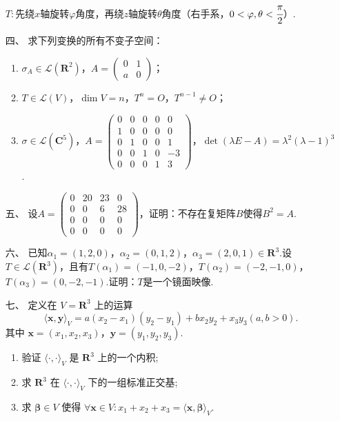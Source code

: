 \begin{enumerate}
    $T:$先绕$x$轴旋转$\varphi$角度，再绕$z$轴旋转$\theta$角度（右手系，$0<\varphi,\theta<\cfrac{\pi}{2}$）.
	\item[四、]求下列变换的所有不变子空间：
	\begin{enumerate}[label=(\arabic*)]
        \item $\sigma_A\in\mathcal{L}(\mathbf{R}^2)$，$A=\begin{pmatrix}
            0 & 1 \\ a & 0
        \end{pmatrix}$；
        \item $T\in\mathcal{L}(V)$，$\dim V=n$，$T^n=O$，$T^{n-1}\neq O$；
        \item $\sigma\in\mathcal{L}(\mathbf{C}^5)$，$A=\begin{pmatrix}
            0 & 0 & 0 & 0 & 0 \\ 1 & 0 & 0 & 0 & 0 \\ 0 & 1 & 0 & 0 & 1 \\ 0 & 0 & 1 & 0 & -3 \\ 0 & 0 & 0 & 1 & 3
        \end{pmatrix}$，$\det(\lambda E-A)=\lambda^2(\lambda-1)^3$.
    \end{enumerate}
	\item[五、]设$A=\begin{pmatrix}
        0 & 20 & 23 & 0 \\ 0 & 0 & 6 & 28 \\ 0 & 0 & 0 & 0 \\ 0 & 0 & 0 & 0
    \end{pmatrix}$，证明：不存在复矩阵$B$使得$B^2=A$.
	\item[六、]已知$\alpha_1=(1,2,0)$，$\alpha_2=(0,1,2)$，$\alpha_3=(2,0,1)\in\mathbf{R}^3$.设$T\in\mathcal{L}(\mathbf{R}^3)$，且有$T(\alpha_1)=(-1,0,-2)$，$T(\alpha_2)=(-2,-1,0)$，$T(\alpha_3)=(0,-2,-1)$.证明：$T$是一个镜面映像.
    \item[七、]定义在 $ V = \mathbf{R}^3 $ 上的运算
    \[ \langle \boldsymbol{x}, \boldsymbol{y} \rangle_V = a(x_2-x_1)(y_2-y_1)+bx_2y_2+x_3y_3(a,b>0). \]
    其中 $ \boldsymbol{x} = (x_1, x_2, x_3) $，$ \boldsymbol{y} = (y_1, y_2, y_3) $.
    \begin{enumerate}[label=(\arabic*)]
        \item 验证 $ \langle \cdot, \cdot \rangle_V $ 是 $ \mathbf{R}^3 $ 上的一个内积;
        \item 求 $ \mathbf{R}^3 $ 在 $ \langle \cdot, \cdot \rangle_V $ 下的一组标准正交基;
        \item 求 $ \boldsymbol{\beta} \in V $ 使得 $ \forall \boldsymbol{x} \in V: x_1 + x_2 + x_3 = \langle \boldsymbol{x}, \boldsymbol{\beta} \rangle_V $.

\end{enumerate}
\end{enumerate}
